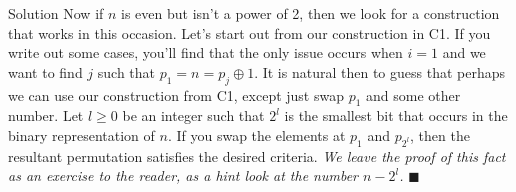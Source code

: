 \documentclass{article}
\begin{document}
\begin{solution}{Solution}
Now if $n$ is even but isn't a power of 2, then we look for a construction
that works in this occasion. Let's start out from our construction in
C1. If you write out some cases, you'll find that
the only issue occurs when $i = 1$ and we want to find $j$ such that
$p_1 = n = p_j \oplus 1$.
It is natural then to guess that perhaps we can use
our construction from C1, except just swap $p_1$ and some other number.
Let $l \geq 0$ be an integer such that $2^l$ is the
smallest bit that occurs in the binary representation of $n$.
If you swap the elements at $p_1$ and $p_{2^l}$, then the resultant
permutation satisfies the desired criteria. \textit{We leave the proof
of this fact as an exercise to the reader, as a hint look at the number
$n - 2^l$.} $\blacksquare$
\end{solution}
\end{document}
